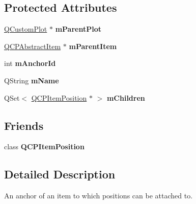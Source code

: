 \subsection*{Protected Attributes}
\begin{DoxyCompactItemize}
\item 
\hypertarget{classQCPItemAnchor_a59b968410831ba91a25cc75a77dde6f5}{\hyperlink{classQCustomPlot}{Q\-Custom\-Plot} $\ast$ {\bfseries m\-Parent\-Plot}}\label{classQCPItemAnchor_a59b968410831ba91a25cc75a77dde6f5}

\item 
\hypertarget{classQCPItemAnchor_a80fad480ad3bb980446ed6ebc00818ae}{\hyperlink{classQCPAbstractItem}{Q\-C\-P\-Abstract\-Item} $\ast$ {\bfseries m\-Parent\-Item}}\label{classQCPItemAnchor_a80fad480ad3bb980446ed6ebc00818ae}

\item 
\hypertarget{classQCPItemAnchor_a00c62070333e8345976b579676ad3997}{int {\bfseries m\-Anchor\-Id}}\label{classQCPItemAnchor_a00c62070333e8345976b579676ad3997}

\item 
\hypertarget{classQCPItemAnchor_a23ad4d0ab0d2cbb41a7baf05bcf996ec}{Q\-String {\bfseries m\-Name}}\label{classQCPItemAnchor_a23ad4d0ab0d2cbb41a7baf05bcf996ec}

\item 
\hypertarget{classQCPItemAnchor_a5f0e67f395a63e2dd0e29ff1dcaf37b7}{Q\-Set$<$ \hyperlink{classQCPItemPosition}{Q\-C\-P\-Item\-Position} $\ast$ $>$ {\bfseries m\-Children}}\label{classQCPItemAnchor_a5f0e67f395a63e2dd0e29ff1dcaf37b7}

\end{DoxyCompactItemize}
\subsection*{Friends}
\begin{DoxyCompactItemize}
\item 
\hypertarget{classQCPItemAnchor_aa9b8ddc062778e202a0be06a57d18d17}{class {\bfseries Q\-C\-P\-Item\-Position}}\label{classQCPItemAnchor_aa9b8ddc062778e202a0be06a57d18d17}

\end{DoxyCompactItemize}


\subsection{Detailed Description}
An anchor of an item to which positions can be attached to. 

